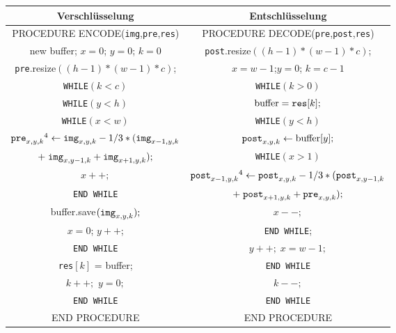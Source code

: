 \documentclass[a4paper,12pt]{article}
\begin{document}
\begin{tabular}{c|c}
Verschlüsselung & Entschlüsselung
\\
\hline
PROCEDURE ENCODE({\tt{img}},{\tt{pre}},{\tt{res}}) & PROCEDURE DECODE({\tt{pre}},{\tt{post}},{\tt{res}})
\\
new buffer; $x=0$; $y=0$; $k=0$ & {\tt{post}}.resize$((h-1)*(w-1)*c)$;
\\
{\tt{pre}}.resize$((h-1)*(w-1)*c)$; & $x=w-1$;$y=0$; $k=c-1$
\\
{\tt{WHILE}}$(k < c)$ &                  {\tt{WHILE}}$(k > 0)$
\\
{\tt{WHILE}}$(y < h)$ &               $\text{buffer} = \text{{\tt{res}}}[k];$
\\
{\tt{WHILE}}$(x < w)$ &              {\tt{WHILE}}$(y<h)$
\\
$\text{{\tt{pre}}}_{x,y,k}\footnotemark[4]\leftarrow \text{{\tt{img}}}_{x,y,k} - 1/3 *(\text{{\tt{img}}}_{x-1,y,k}$ &  $\text{{\tt{post}}}_{x,y,k}\leftarrow \text{buffer}[y];$
\\
$+\;\text{{\tt{img}}}_{x,y-1,k} + \text{{\tt{img}}}_{x+1,y,k});$  & {\tt{WHILE}}$(x>1)$
\\
$x++;$ &  $\text{{\tt{post}}}_{x-1,y,k}\footnotemark[4]\leftarrow \text{{\tt{post}}}_{x,y,k} - 1/3 *(\text{{\tt{post}}}_{x,y-1,k} $    
\\
{\tt{END {\tt{WHILE}}}}  & $+\;\text{{\tt{post}}}_{x+1,y,k} + \text{{\tt{pre}}}_{x,y,k});$
\\
buffer.save$(\text{{\tt{img}}}_{x,y,k});$  & $x--;$
\\
$x=0$; $y++$;  &   {\tt{END {\tt{WHILE}}}}; 
\\
{\tt{END {\tt{WHILE}}}}   & $y++;\;x=w-1;$ 
\\
{\tt{res}}$[k]$ = buffer;  &  {\tt{END {\tt{WHILE}}}} 
\\
$k++;$ $y=0;$   &   $k--;$ 
\\
{\tt{END {\tt{WHILE}}}} & {\tt{END {\tt{WHILE}}}} 
\\
END PROCEDURE & END PROCEDURE
\end{tabular}
\end{document}
